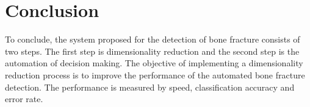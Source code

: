 \documentclass[11pt,twocolumn]{witseiepaper}
\begin{document}
	\section{Conclusion}
	To conclude, the system proposed for the detection of bone fracture consists of two steps. The first step is dimensionality reduction and the second step is the automation of decision making. The objective of implementing a dimensionality reduction process is to improve the performance of the automated bone fracture detection. The performance is measured by speed, classification accuracy and error rate. 
	
	\newpage
	
	
	
\end{document}

